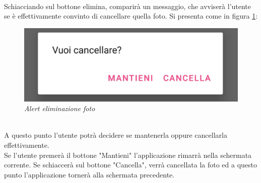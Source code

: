 \\Schiacciando sul bottone elimina, comparirà un messaggio, che avviserà l'utente se è effettivamente convinto di cancellare quella foto. Si presenta come in figura \ref{fig:alertfoto}:
\begin{figure}[!h]
    \centering
	\includegraphics[scale=0.2]{Tesi/images/AlertFoto}
	\caption{\textit{Alert eliminazione foto}}
	\label{fig:alertfoto}
\end{figure}
\\A questo punto l'utente potrà decidere se mantenerla oppure cancellarla effettivamente. 
\\Se l'utente premerà il bottone "Mantieni" l'applicazione rimarrà nella schermata corrente. Se schiaccerà sul bottone "Cancella", verrà cancellata la foto ed a questo punto l'applicazione tornerà alla schermata precedente.\pagebreak

